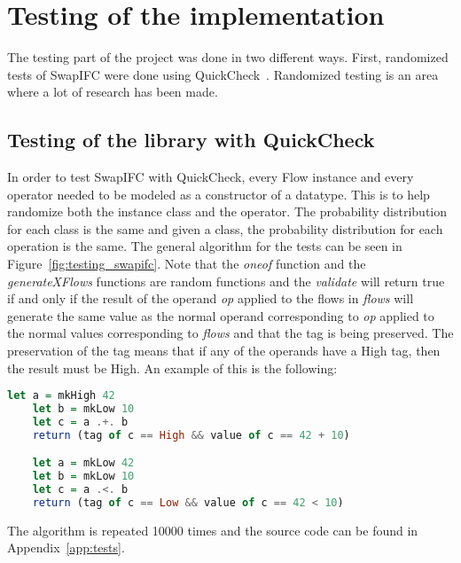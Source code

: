 \section{Testing of the implementation}
The testing part of the project was done in two different ways. First, randomized tests of SwapIFC were done using QuickCheck~\cite{quickcheck, quickcheck-wiki}. Randomized testing is an area where a lot of research has been made.
\subsection{Testing of the library with QuickCheck}
In order to test SwapIFC with QuickCheck, every Flow instance and every operator needed to be modeled as a constructor of a datatype. This is to help randomize both the instance class and the operator. The probability distribution for each class is the same and given a class, the probability distribution for each operation is the same. The general algorithm for the tests can be seen in Figure~\ref{fig:testing_swapifc}. Note that the \emph{oneof} function and the \emph{generateXFlows} functions are random functions and the \emph{validate} will return true if and only if the result of the operand \emph{op} applied to the flows in \emph{flows} will generate the same value as the normal operand corresponding to \emph{op} applied to the normal values corresponding to \emph{flows} and that the tag is being preserved. The preservation of the tag means that if any of the operands have a High tag, then the result must be High. An example of this is the following:
\begin{center}
  \begin{lstlisting}[language=Haskell]
    let a = mkHigh 42
    let b = mkLow 10
    let c = a .+. b
    return (tag of c == High && value of c == 42 + 10)

    let a = mkLow 42
    let b = mkLow 10
    let c = a .<. b
    return (tag of c == Low && value of c == 42 < 10)
  \end{lstlisting}
\end{center}
The algorithm is repeated 10000 times and the source code can be found in Appendix~\ref{app:tests}.

